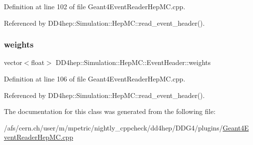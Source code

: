 Definition at line 102 of file Geant4\+Event\+Reader\+Hep\+M\+C.\+cpp.



Referenced by D\+D4hep\+::\+Simulation\+::\+Hep\+M\+C\+::read\+\_\+event\+\_\+header().

\hypertarget{class_d_d4hep_1_1_simulation_1_1_hep_m_c_1_1_event_header_a21a1d471bc6ce75aedfdb9be2db5b0b2}{}\label{class_d_d4hep_1_1_simulation_1_1_hep_m_c_1_1_event_header_a21a1d471bc6ce75aedfdb9be2db5b0b2} 
\subsubsection{\texorpdfstring{weights}{weights}}
{\footnotesize\ttfamily vector$<$float$>$ D\+D4hep\+::\+Simulation\+::\+Hep\+M\+C\+::\+Event\+Header\+::weights}



Definition at line 106 of file Geant4\+Event\+Reader\+Hep\+M\+C.\+cpp.



Referenced by D\+D4hep\+::\+Simulation\+::\+Hep\+M\+C\+::read\+\_\+event\+\_\+header().



The documentation for this class was generated from the following file\+:\begin{DoxyCompactItemize}
\item 
/afs/cern.\+ch/user/m/mpetric/nightly\+\_\+cppcheck/dd4hep/\+D\+D\+G4/plugins/\hyperlink{_geant4_event_reader_hep_m_c_8cpp}{Geant4\+Event\+Reader\+Hep\+M\+C.\+cpp}\end{DoxyCompactItemize}
